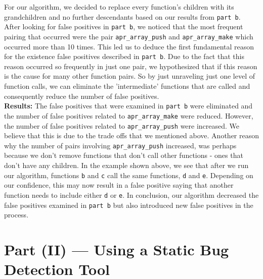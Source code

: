 \documentclass{article}
\begin{document}
For our algorithm, we decided to replace every function's children with its grandchildren and no further descendants based on our results from \verb|part b|. After looking for false positives in \verb|part b|, we noticed that the most frequent pairing that occurred were the pair \verb|apr_array_push| and \verb|apr_array_make| which occurred more than 10 times. This led us to deduce the first fundamental reason for the existence false positives described in \verb|part b|. Due to the fact that this reason occurred so frequently in just one pair, we hypothesized that if this reason is the cause for many other function pairs. So by just unraveling just one level of function calls, we can eliminate the 'intermediate' functions that are called and consequently reduce the number of false positives. \\

\textbf{Results:}
The false positives that were examined in \verb|part b| were eliminated and the number of false positives related to \verb|apr_array_make| were reduced. However, the number of false positives related to \verb|apr_array_push| were increased. We believe that this is due to the trade offs that we mentioned above. Another reason why the number of pairs involving \verb|apr_array_push| increased, was perhaps because we don't remove functions that don't call other functions - ones that don't have any children. In the example shown above, we see that after we run our algorithm, functions \verb|b| and \verb|c| call the same functions, \verb|d| and \verb|e|. Depending on our confidence, this may now result in a false positive saying that another function needs to include either \verb|d| or \verb|e|.
In conclusion, our algorithm decreased the false positives examined in \verb|part b| but also introduced new false positives in the process.

\section*{Part (II) --- Using a Static Bug Detection Tool}
\end{document}

